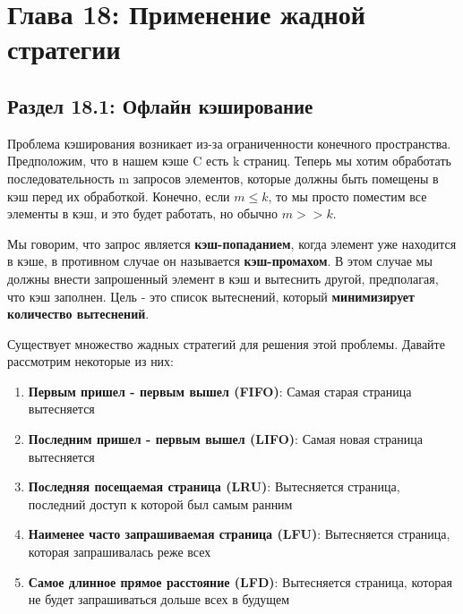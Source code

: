 
\chapter*{Глава 18: Применение жадной стратегии}
\section*{Раздел 18.1: Офлайн кэширование}

Проблема кэширования возникает из-за ограниченности конечного пространства. Предположим, что в нашем кэше C есть k страниц. Теперь мы хотим обработать последовательность m запросов элементов, которые должны быть помещены в кэш перед их обработкой. Конечно, если $m \leq k$, то мы просто поместим все элементы в кэш, и это будет работать, но обычно $m>>k$.

\vspace{\baselineskip}

Мы говорим, что запрос является \textbf{кэш-попаданием}, когда элемент уже находится в кэше, в противном случае он называется \textbf{кэш-промахом}. В этом случае мы должны внести запрошенный элемент в кэш и вытеснить другой, предполагая, что кэш заполнен. Цель - это список вытеснений, который \textbf{минимизирует количество вытеснений}.

\vspace{\baselineskip}

Существует множество жадных стратегий для решения этой проблемы. Давайте рассмотрим некоторые из них:

\begin{enumerate}
    \item \textbf{Первым пришел - первым вышел (FIFO)}: Самая старая страница вытесняется
    \item \textbf{Последним пришел - первым вышел (LIFO)}: Самая новая страница вытесняется
    \item \textbf{Последняя посещаемая страница (LRU)}: Вытесняется страница, последний доступ к которой был самым ранним
    \item \textbf{Наименее часто запрашиваемая страница (LFU)}: Вытесняется страница, которая запрашивалась реже всех
    \item \textbf{Самое длинное прямое расстояние (LFD)}: Вытесняется страница, которая не будет запрашиваться дольше всех в будущем
\end{enumerate}

\vspace{\baselineskip}

